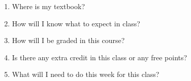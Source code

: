 \documentclass[11pt,fleqn]{article}
\begin{document}
\begin{enumerate}
\vfill
\item Where is my textbook?\\
\vfill
\item How will I know what to expect in class?
\vfill
\item How will I be graded in this course? \\
\vfill
\item Is there any extra credit in this class or any free points?\\
\vfill
\item What will I need to do this week for this class?\\
\vfill


\end{enumerate}
\end{document}
